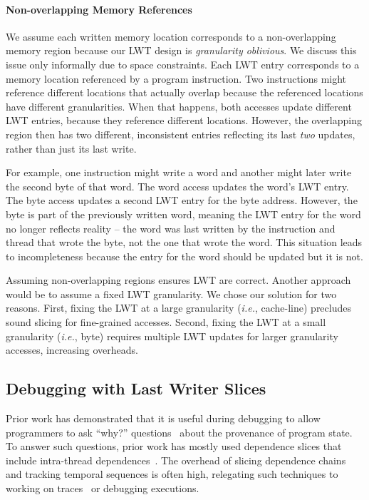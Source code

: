 \documentclass[preprint,9pt]{sigplanconf}
\newcommand{\lwt}{LWT\xspace}
\begin{document}
\paragraph{Non-overlapping Memory References} 
We assume each written memory location corresponds to a non-overlapping memory
region because our \lwt design is {\em granularity oblivious}.  We discuss this
issue only informally due to space constraints.  Each \lwt entry corresponds to
a memory location referenced by a program instruction.  Two instructions might
reference different locations that actually overlap because the referenced
locations have different granularities.  When that happens, both accesses
update different \lwt entries, because they reference different locations.
However, the overlapping region then has two different, inconsistent entries
reflecting its last {\em two} updates, rather than just its last write.

For example, one instruction might write a word and another might later write
the second byte of that word.  The word access updates the word's \lwt entry.
The byte access updates a second \lwt entry for the byte address.  However, the
byte is part of the previously written word, meaning the \lwt entry for the
word no longer reflects reality -- the word was last written by the instruction
and thread that wrote the byte, not the one that wrote the word.  This
situation leads to incompleteness because the entry for the word should be
updated but it is not.

Assuming non-overlapping regions ensures \lwt are correct.  Another
approach would be to assume a fixed \lwt granularity.  We chose our solution
for two reasons.  First, fixing the \lwt at a large granularity ({\em i.e.},
cache-line) precludes sound slicing for fine-grained accesses.  Second, fixing
the \lwt at a small granularity ({\em i.e.}, byte) requires multiple \lwt
updates for larger granularity accesses, increasing overheads.




\subsection{Debugging with Last Writer Slices}
\label{sec:debugging}
Prior work has demonstrated that it is useful during debugging to allow
programmers to ask ``why?'' questions~\cite{whylineicse,whylinechi} about the
provenance of program state.  To answer such questions, prior work has mostly
used dependence slices that include intra-thread
dependences~\cite{whylineicse,conseq,tipslicingsurvey}.  The overhead of
slicing dependence chains and tracking temporal sequences is often high,
relegating such techniques to working on traces~\cite{whylinechi} or debugging
executions.  
\end{document}
